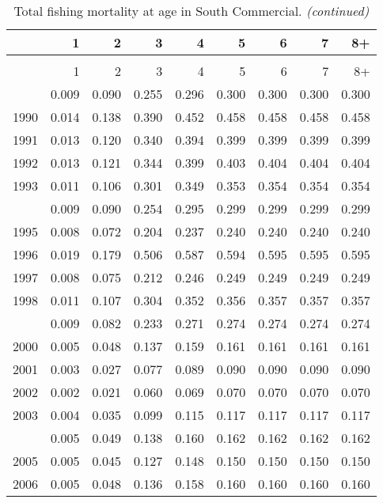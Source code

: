\documentclass[
]{article}
\begin{document}
\begin{longtable}[t]{lrrrrrrrr}
\caption{\label{tab:South_Commercial-fleet-FAA-table}Total fishing mortality at age in South Commercial.}\\
\toprule
  & 1 & 2 & 3 & 4 & 5 & 6 & 7 & 8+\\
\midrule
\endfirsthead
\caption[]{Total fishing mortality at age in South Commercial. \textit{(continued)}}\\
\toprule
  & 1 & 2 & 3 & 4 & 5 & 6 & 7 & 8+\\
\midrule
\endhead

\endfoot
\bottomrule
\endlastfoot
1989 & 0.009 & 0.090 & 0.255 & 0.296 & 0.300 & 0.300 & 0.300 & 0.300\\
1990 & 0.014 & 0.138 & 0.390 & 0.452 & 0.458 & 0.458 & 0.458 & 0.458\\
1991 & 0.013 & 0.120 & 0.340 & 0.394 & 0.399 & 0.399 & 0.399 & 0.399\\
1992 & 0.013 & 0.121 & 0.344 & 0.399 & 0.403 & 0.404 & 0.404 & 0.404\\
1993 & 0.011 & 0.106 & 0.301 & 0.349 & 0.353 & 0.354 & 0.354 & 0.354\\
\addlinespace
1994 & 0.009 & 0.090 & 0.254 & 0.295 & 0.299 & 0.299 & 0.299 & 0.299\\
1995 & 0.008 & 0.072 & 0.204 & 0.237 & 0.240 & 0.240 & 0.240 & 0.240\\
1996 & 0.019 & 0.179 & 0.506 & 0.587 & 0.594 & 0.595 & 0.595 & 0.595\\
1997 & 0.008 & 0.075 & 0.212 & 0.246 & 0.249 & 0.249 & 0.249 & 0.249\\
1998 & 0.011 & 0.107 & 0.304 & 0.352 & 0.356 & 0.357 & 0.357 & 0.357\\
\addlinespace
1999 & 0.009 & 0.082 & 0.233 & 0.271 & 0.274 & 0.274 & 0.274 & 0.274\\
2000 & 0.005 & 0.048 & 0.137 & 0.159 & 0.161 & 0.161 & 0.161 & 0.161\\
2001 & 0.003 & 0.027 & 0.077 & 0.089 & 0.090 & 0.090 & 0.090 & 0.090\\
2002 & 0.002 & 0.021 & 0.060 & 0.069 & 0.070 & 0.070 & 0.070 & 0.070\\
2003 & 0.004 & 0.035 & 0.099 & 0.115 & 0.117 & 0.117 & 0.117 & 0.117\\
\addlinespace
2004 & 0.005 & 0.049 & 0.138 & 0.160 & 0.162 & 0.162 & 0.162 & 0.162\\
2005 & 0.005 & 0.045 & 0.127 & 0.148 & 0.150 & 0.150 & 0.150 & 0.150\\
2006 & 0.005 & 0.048 & 0.136 & 0.158 & 0.160 & 0.160 & 0.160 & 0.160\\

\end{longtable}
\end{document}
